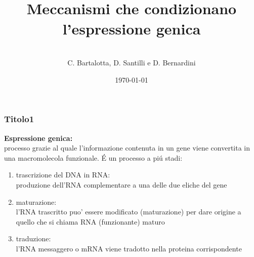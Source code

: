 \documentclass[hyperref={pdfpagelabels=false}]{beamer}
\title{\\Meccanismi che condizionano l'espressione genica\\}
\author{\\ C. Bartalotta, D. Santilli e D. Bernardini}
\date{\today}
\begin{document}
\begin{frame}
\titlepage
\end{frame} 

\begin{frame}\frametitle{Titolo1}
\textbf{Espressione genica:}\\
processo grazie al quale l'informazione contenuta in un gene viene convertita in una macromolecola funzionale.
\'E un processo a pi\'u stadi:\pause 
\begin{enumerate}
\item trascrizione del DNA in RNA:\\
produzione dell'RNA complementare a una delle due eliche del gene  \pause 
\item maturazione:\\
l'RNA trascritto puo' essere modificato (maturazione) per dare origine a quello che si chiama RNA (funzionante) maturo \pause 
\item traduzione:\\
l'RNA messaggero o mRNA viene tradotto nella proteina corrispondente
\end{enumerate}
\end{frame}
\end{document}
